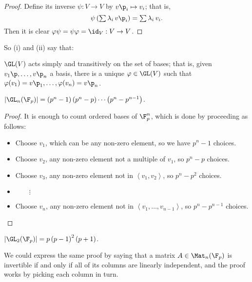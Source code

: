 \begin{proof}
	Define its inverse $\psi:V\to V$ by $v\p_i \mapsto v_i$; that is, %
	\begin{equation*}
		\textstyle\psi\left( \sum \lambda_i\,v\p_i \right) = \sum \lambda_i \, v_i. %
	\end{equation*}
	Then it is clear $\varphi\psi = \psi\varphi = \id_V:V\to V$.
\end{proof}

	\pagebreak

So (i) and (ii) say that:

\begin{proposition}
	$\GL(V)$ acts simply and transitively on the set of bases; that is, given $v_1\p,\ldots,v\p_n$ a basis, there is a unique $\varphi\in\GL(V)$ such that $\varphi(v_1)=v\p_1, \ldots, \varphi(v_n)=v\p_n$. %
\end{proposition}

\begin{corollary}
	$\left\vert \GL_n(\F_p) \right\vert = \left( p^n-1 \right)\left( p^n-p \right) \cdots \left( p^n - p^{n-1} \right)$. %
\end{corollary}

\begin{proof}
	It is enough to count ordered bases of $\F_p^n$, which is done by proceeding as follows: %
	\begin{itemize}
		\shortskip
		\item [] Choose $v_1$, which can be any non-zero element, so we have $p^n-1$ choices. %
		\item [] Choose $v_2$, any non-zero element not a multiple of $v_1$, so $p^n-p$ choices. %
		\item [] Choose $v_3$, any non-zero element not in $\left\langle v_1,v_2 \right\rangle$, so $p^n-p^2$ choices. %
		\item [] $\qquad\!\vdots$
		\item [] Choose $v_n$, any non-zero element not in $\left\langle v_1,\ldots,v_{n-1} \right\rangle$, so $p^n-p^{n-1}$ choices. \qedhere %
	\end{itemize}
\end{proof}

\begin{example}
	$\left\vert \GL_2(\F_p) \right\vert = p\left( p-1 \right)^2 \left( p+1 \right)$. %
\end{example}

\begin{remark}
	We could express the same proof by saying that a matrix $A\in\Mat_n(\F_p)$ is invertible if and only if all of its columns are linearly independent, and the proof works by picking each column in turn. %
\end{remark}

